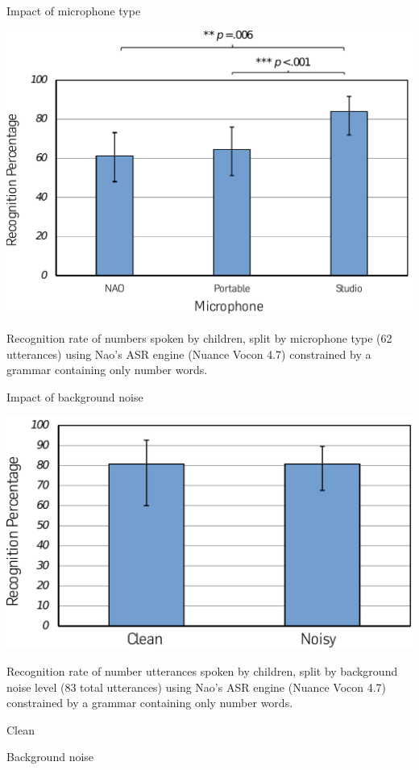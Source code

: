 \documentclass[compress]{beamer}
\begin{document}
\begin{frame}{Impact of microphone type}

    \begin{center}
        \includegraphics[width=0.8\linewidth]{mic_graph}
    \end{center}

Recognition rate of numbers spoken by children, split by microphone type
(62 utterances) using Nao's ASR engine (Nuance Vocon 4.7) constrained by
a grammar containing only number words.

\end{frame}

\begin{frame}{Impact of background noise}

\begin{center}
    \includegraphics[width=0.8\linewidth]{noise_graph}
\end{center}

Recognition rate of number utterances spoken by children, split by
background noise level (83 total utterances) using Nao's ASR engine
(Nuance Vocon 4.7) constrained by a grammar containing only number
words.

Clean

Background noise

\end{frame}
\end{document}
